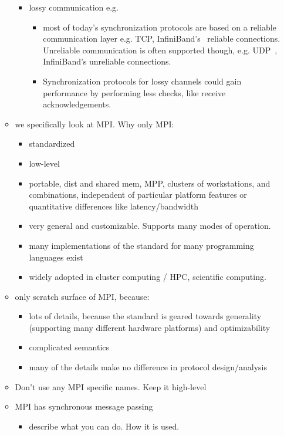 \documentclass[a4paper, 10pt]{article}
\begin{document}
\begin{enumerate}
\begin{itemize}
\begin{itemize}
			\item lossy communication e.g.
				\begin{itemize}
					\item most of today's synchronization protocols are based on a reliable communication layer e.g. TCP, InfiniBand's~\cite{infiniband} reliable connections. Unreliable communication is often supported though, e.g. UDP~\cite{udp}, InfiniBand's unreliable connections.
					\item Synchronization protocols for lossy channels could gain performance by performing less checks, like receive acknowledgements.
				\end{itemize}
		\end{itemize}
	\label{why-only-mpi}
	\item we specifically look at MPI\cite{mpi}. Why only MPI:
		\begin{itemize}
			\item standardized
			\item low-level
			\item portable, dist and shared mem, MPP, clusters of workstations, and combinations, independent of particular platform features or quantitative differences like latency/bandwidth
			\item very general and customizable. Supports many modes of operation.
			\item many implementations of the standard for many programming languages exist
			\item widely adopted in cluster computing / HPC, scientific computing.~\cite{mpiadoptiona, mpiadoptionb, mpiadoptionc}
		\end{itemize}
	\item only scratch surface of MPI, because:
		\begin{itemize}
			\item lots of details, because the standard is geared towards generality (supporting many different hardware platforms) and optimizability
			\item complicated semantics
			\item many of the details make no difference in protocol design/analysis
		\end{itemize}
	\item Don't use any MPI specific names. Keep it high-level
	\item MPI has synchronous message passing
		\begin{itemize}
			\item describe what you can do. How it is used.

\end{itemize}
\end{itemize}
\end{enumerate}
\end{document}
